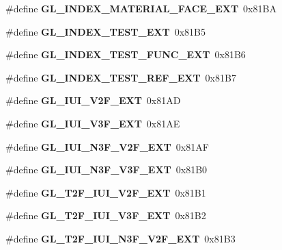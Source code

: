 \begin{DoxyCompactItemize}
\item 
\#define {\bfseries G\+L\+\_\+\+I\+N\+D\+E\+X\+\_\+\+M\+A\+T\+E\+R\+I\+A\+L\+\_\+\+F\+A\+C\+E\+\_\+\+E\+X\+T}~0x81\+B\+A\label{_s_d_l__opengl_8h_a85c6541bd6dc828d9f3ffdef53854cf7}

\item 
\#define {\bfseries G\+L\+\_\+\+I\+N\+D\+E\+X\+\_\+\+T\+E\+S\+T\+\_\+\+E\+X\+T}~0x81\+B5\label{_s_d_l__opengl_8h_a39e66d637dfb543ffa841ef1b04ac91a}

\item 
\#define {\bfseries G\+L\+\_\+\+I\+N\+D\+E\+X\+\_\+\+T\+E\+S\+T\+\_\+\+F\+U\+N\+C\+\_\+\+E\+X\+T}~0x81\+B6\label{_s_d_l__opengl_8h_a5eaf7b6be627ea8e6b35be8b24c27138}

\item 
\#define {\bfseries G\+L\+\_\+\+I\+N\+D\+E\+X\+\_\+\+T\+E\+S\+T\+\_\+\+R\+E\+F\+\_\+\+E\+X\+T}~0x81\+B7\label{_s_d_l__opengl_8h_a01b7c950176b6f9cc4cad91ff9c5cce5}

\item 
\#define {\bfseries G\+L\+\_\+\+I\+U\+I\+\_\+\+V2\+F\+\_\+\+E\+X\+T}~0x81\+A\+D\label{_s_d_l__opengl_8h_a88e50cbad9cb42fc29d1f8c4d6e42384}

\item 
\#define {\bfseries G\+L\+\_\+\+I\+U\+I\+\_\+\+V3\+F\+\_\+\+E\+X\+T}~0x81\+A\+E\label{_s_d_l__opengl_8h_a3f577835259a490f499ab9162724353a}

\item 
\#define {\bfseries G\+L\+\_\+\+I\+U\+I\+\_\+\+N3\+F\+\_\+\+V2\+F\+\_\+\+E\+X\+T}~0x81\+A\+F\label{_s_d_l__opengl_8h_a63b0d319f24b24efd1f8259717d4d147}

\item 
\#define {\bfseries G\+L\+\_\+\+I\+U\+I\+\_\+\+N3\+F\+\_\+\+V3\+F\+\_\+\+E\+X\+T}~0x81\+B0\label{_s_d_l__opengl_8h_a821236f54a3d536e39d0c0c1b2c2200b}

\item 
\#define {\bfseries G\+L\+\_\+\+T2\+F\+\_\+\+I\+U\+I\+\_\+\+V2\+F\+\_\+\+E\+X\+T}~0x81\+B1\label{_s_d_l__opengl_8h_a28149ed35e8f7d352392774603609517}

\item 
\#define {\bfseries G\+L\+\_\+\+T2\+F\+\_\+\+I\+U\+I\+\_\+\+V3\+F\+\_\+\+E\+X\+T}~0x81\+B2\label{_s_d_l__opengl_8h_ae051338aef670c8b34639269e174cbe6}

\item 
\#define {\bfseries G\+L\+\_\+\+T2\+F\+\_\+\+I\+U\+I\+\_\+\+N3\+F\+\_\+\+V2\+F\+\_\+\+E\+X\+T}~0x81\+B3\label{_s_d_l__opengl_8h_a950fe08f37bcf9082bf5ec6d1479668c}


\end{DoxyCompactItemize}
